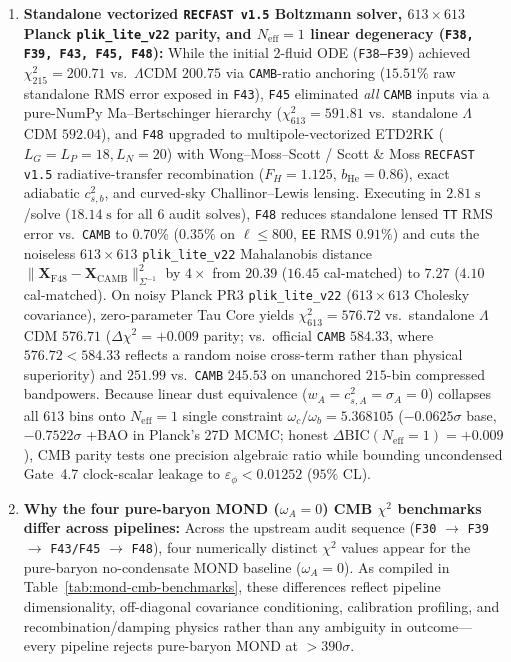 \documentclass[11pt]{article}
\begin{document}
\begin{enumerate}[leftmargin=1.8em]
\item \textbf{Standalone vectorized \texttt{RECFAST v1.5} Boltzmann solver, $613\times 613$ Planck \texttt{plik\_lite\_v22} parity, and $N_{\mathrm{eff}}=1$ linear degeneracy (\texttt{F38, F39, F43, F45, F48}):}
While the initial 2-fluid ODE (\texttt{F38--F39}) achieved $\chi^2_{215}=200.71$ vs.\ $\Lambda$CDM $200.75$ via \texttt{CAMB}-ratio anchoring ($15.51\%$ raw standalone RMS error exposed in \texttt{F43}), \texttt{F45} eliminated \emph{all} \texttt{CAMB} inputs via a pure-NumPy Ma--Bertschinger hierarchy ($\chi^2_{613}=591.81$ vs.\ standalone $\Lambda$CDM $592.04$), and \texttt{F48} upgraded to multipole-vectorized ETD2RK ($L_G=L_P=18, L_N=20$) with Wong--Moss--Scott / Scott \& Moss \texttt{RECFAST v1.5} radiative-transfer recombination ($F_H=1.125$, $b_{\mathrm{He}}=0.86$), exact adiabatic $c_{s,b}^2$, and curved-sky Challinor--Lewis lensing. Executing in $2.81\;\mathrm{s}$/solve ($18.14\;\mathrm{s}$ for all $6$ audit solves), \texttt{F48} reduces standalone lensed \texttt{TT} RMS error vs.\ \texttt{CAMB} to $0.70\%$ ($0.35\%$ on $\ell\le 800$, \texttt{EE} RMS $0.91\%$) and cuts the noiseless $613\times 613$ \texttt{plik\_lite\_v22} Mahalanobis distance $\|\mathbf{X}_{\mathrm{F48}}-\mathbf{X}_{\mathrm{CAMB}}\|_{\Sigma^{-1}}^2$ by $4\times$ from $20.39$ ($16.45$ cal-matched) to $7.27$ ($4.10$ cal-matched). On noisy Planck PR3 \texttt{plik\_lite\_v22} ($613\times 613$ Cholesky covariance), zero-parameter Tau Core yields $\chi^2_{613}=576.72$ vs.\ standalone $\Lambda$CDM $576.71$ ($\Delta\chi^2=+0.009$ parity; vs.\ official \texttt{CAMB} $584.33$, where $576.72<584.33$ reflects a random noise cross-term rather than physical superiority) and $251.99$ vs.\ \texttt{CAMB} $245.53$ on unanchored $215$-bin compressed bandpowers. Because linear dust equivalence ($w_A=c_{s,A}^2=\sigma_A=0$) collapses all $613$ bins onto $N_{\mathrm{eff}}=1$ single constraint $\omega_c/\omega_b=5.368105$ ($-0.0625\sigma$ base, $-0.7522\sigma$ +BAO in Planck's 27D MCMC; honest $\Delta\mathrm{BIC}(N_{\mathrm{eff}}=1)=+0.009$), CMB parity tests one precision algebraic ratio while bounding uncondensed Gate~4.7 clock-scalar leakage to $\varepsilon_\phi<0.01252$ ($95\%$ CL).

\item \textbf{Why the four pure-baryon MOND ($\omega_A=0$) CMB $\chi^2$ benchmarks differ across pipelines:}
Across the upstream audit sequence (\texttt{F30} $\to$ \texttt{F39} $\to$ \texttt{F43/F45} $\to$ \texttt{F48}), four numerically distinct $\chi^2$ values appear for the pure-baryon no-condensate MOND baseline ($\omega_A=0$). As compiled in Table~\ref{tab:mond-cmb-benchmarks}, these differences reflect pipeline dimensionality, off-diagonal covariance conditioning, calibration profiling, and recombination/damping physics rather than any ambiguity in outcome---every pipeline rejects pure-baryon MOND at $>390\sigma$.
\end{enumerate}
\end{document}

